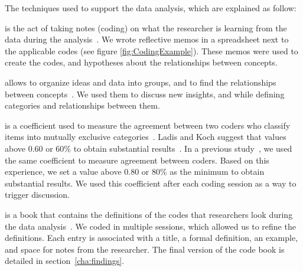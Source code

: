\documentclass{sig-alternate-05-2015}
\begin{document}
The techniques used to support the data analysis, which are explained as follow:

	\begin{description}
      \setlength{\itemsep}{3pt}
      \setlength{\parskip}{0pt}
      \setlength{\parsep}{0pt}
		\item[Memoing] is the act of taking notes (coding) on what the researcher is learning from the data during the analysis~\cite{Groenewald2008}.%
We wrote reflective memos in a spreadsheet next to the applicable codes (see figure \ref{fig:CodingExample}).
These memos were used to create the codes, and hypotheses about the relationships between concepts.

		\item[Affinity diagrams] allows to organize ideas and data into groups, and to find the relationships between concepts~\cite{Scupin1997}.
		We used them to discuss new insights, and while defining categories and relationships between them.

		\item[Inter-rater agreement \textit{Cohen Kappa}] is a coefficient used to measure the agreement between two coders who classify items into mutually exclusive categories~\cite{Stemler2004}.
		Ladis and Koch suggest that values above 0.60 or 60\% to obtain substantial results~\cite{Landis1977}.
		In a previous study~\cite{Gomez2013}, we used the same coefficient to measure agreement between coders.
		Based on this experience, we set a value above 0.80 or 80\% as the minimum to obtain substantial results.
		We used this coefficient after each coding session as a way to trigger discussion.

		\item[Code book] is a book that contains the definitions of the codes that researchers look during the data analysis~\cite{MacQueen1998}.
		We coded in multiple sessions, which allowed us to refine the definitions.
		Each entry is associated with a title, a formal definition, an example, and space for notes from the researcher.
		The final version of the code book is detailed in section~\ref{cha:findings}.
	\end{description}
\end{document}
